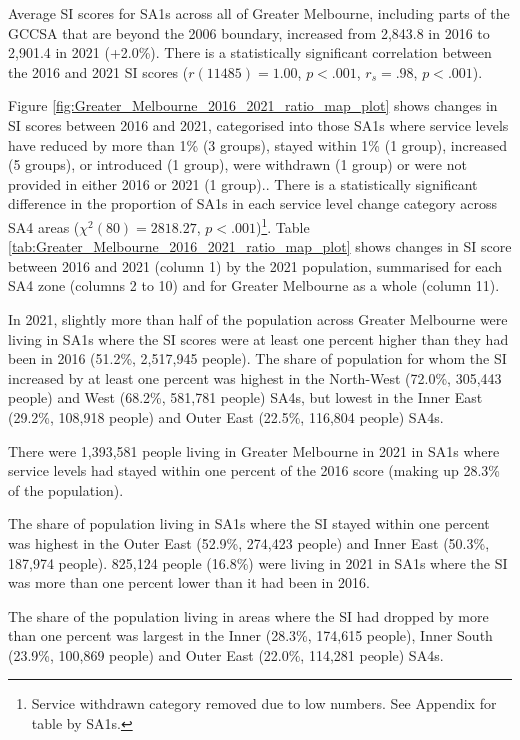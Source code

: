 \documentclass[preprint, 3p,
authoryear]{elsarticle} %
\begin{document}
Average SI scores for SA1s across all of Greater Melbourne, including
parts of the GCCSA that are beyond the 2006 boundary, increased from
2,843.8 in 2016 to 2,901.4 in 2021 (+2.0\%). There is a statistically
significant correlation between the 2016 and 2021 SI scores
(\(r(11485) = 1.00\), \(p < .001\), \(r_s =.98\), \(p < .001\)).

Figure \ref{fig:Greater_Melbourne_2016_2021_ratio_map_plot} shows
changes in SI scores between 2016 and 2021, categorised into those SA1s
where service levels have reduced by more than 1\% (3 groups), stayed
within 1\% (1 group), increased (5 groups), or introduced (1 group),
were withdrawn (1 group) or were not provided in either 2016 or 2021 (1
group).. There is a statistically significant difference in the
proportion of SA1s in each service level change category across SA4
areas (\(\chi^2(80) = 2818.27\), \(p < .001\))\footnote{Service
  withdrawn category removed due to low numbers. See Appendix for table
  by SA1s.}. Table \ref{tab:Greater_Melbourne_2016_2021_ratio_map_plot}
shows changes in SI score between 2016 and 2021 (column 1) by the 2021
population, summarised for each SA4 zone (columns 2 to 10) and for
Greater Melbourne as a whole (column 11).

In 2021, slightly more than half of the population across Greater
Melbourne were living in SA1s where the SI scores were at least one
percent higher than they had been in 2016 (51.2\%, 2,517,945 people).
The share of population for whom the SI increased by at least one
percent was highest in the North-West (72.0\%, 305,443 people) and West
(68.2\%, 581,781 people) SA4s, but lowest in the Inner East (29.2\%,
108,918 people) and Outer East (22.5\%, 116,804 people) SA4s.

There were 1,393,581 people living in Greater Melbourne in 2021 in SA1s
where service levels had stayed within one percent of the 2016 score
(making up 28.3\% of the population).

The share of population living in SA1s where the SI stayed within one
percent was highest in the Outer East (52.9\%, 274,423 people) and Inner
East (50.3\%, 187,974 people). 825,124 people (16.8\%) were living in
2021 in SA1s where the SI was more than one percent lower than it had
been in 2016.

The share of the population living in areas where the SI had dropped by
more than one percent was largest in the Inner (28.3\%, 174,615 people),
Inner South (23.9\%, 100,869 people) and Outer East (22.0\%, 114,281
people) SA4s.
\end{document}
